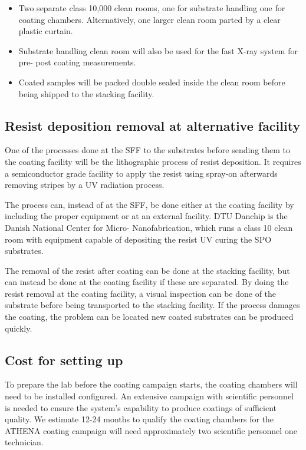 \begin{itemize}
	\item Two separate class 10,000 clean rooms, one for substrate handling one for coating chambers. Alternatively, one larger clean room parted by a clear plastic curtain.
	\item Substrate handling clean room will also be used for the fast X-ray system for pre- post coating measurements.
	\item Coated samples will be packed double sealed inside the clean room before being shipped to the stacking facility.
\end{itemize}

\subsection{Resist deposition removal at alternative facility}
One of the processes done at the SFF to the substrates before sending them to the coating facility will be the lithographic process of resist deposition. It requires a semiconductor grade facility to apply the resist using spray-on afterwards removing stripes by a UV radiation process.

The process can, instead of at the SFF, be done either at the coating facility by including the proper equipment or at an external facility. DTU Danchip is the Danish National Center for Micro- Nanofabrication, which runs a class 10 clean room with equipment capable of depositing the resist UV curing the SPO substrates.

The removal of the resist after coating can be done at the stacking facility, but can instead be done at the coating facility if these are separated. By doing the resist removal at the coating facility, a visual inspection can be done of the substrate before being transported to the stacking facility. If the process damages the coating, the problem can be located new coated substrates can be produced quickly.


\subsection{Cost for setting up}
To prepare the lab before the coating campaign starts, the coating chambers will need to be installed configured. An extensive campaign with scientific personnel is needed to ensure the system's capability to produce coatings of sufficient quality. We estimate 12-24 months to qualify the coating chambers for the ATHENA coating campaign will need approximately two scientific personnel one technician.

